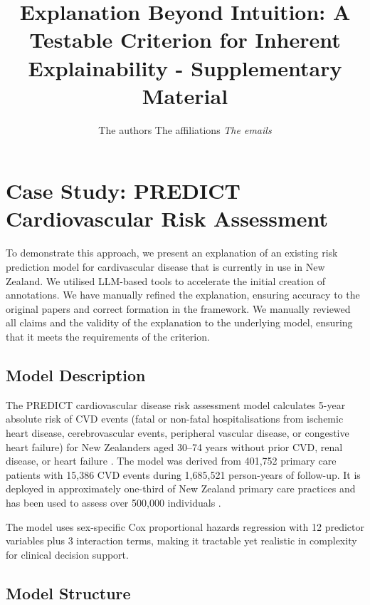 \documentclass{article}
\title{Explanation Beyond Intuition: A Testable Criterion for Inherent Explainability - Supplementary Material}
\author{
The authors
\affiliations
The affiliations
\emails
\textit{The emails}
}
\begin{document}
\maketitle

\appendix

\section{Case Study: PREDICT Cardiovascular Risk Assessment}
\label{sec:predict-case-study}

To demonstrate this approach, we present an explanation of an existing risk prediction model for cardivascular disease that is currently in use in New Zealand. We utilised LLM-based tools to accelerate the initial creation of annotations. We have manually refined the explanation, ensuring accuracy to the original papers and correct formation in the framework. We manually reviewed all claims and the validity of the explanation to the underlying model, ensuring that it meets the requirements of the criterion.

\subsection{Model Description}

The PREDICT cardiovascular disease risk assessment model calculates 5-year absolute risk of CVD events (fatal or non-fatal hospitalisations from ischemic heart disease, cerebrovascular events, peripheral vascular disease, or congestive heart failure) for New Zealanders aged 30--74 years without prior CVD, renal disease, or heart failure \cite{pylypchuk2018cvd}. The model was derived from 401,752 primary care patients with 15,386 CVD events during 1,685,521 person-years of follow-up. It is deployed in approximately one-third of New Zealand primary care practices and has been used to assess over 500,000 individuals \cite{kerr2019}.

The model uses sex-specific Cox proportional hazards regression with 12 predictor variables plus 3 interaction terms, making it tractable yet realistic in complexity for clinical decision support.

\subsection{Model Structure}
\end{document}
